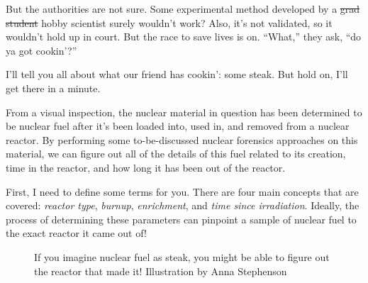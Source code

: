 {\begin{shadequote}
  But the authorities are not sure. Some experimental method developed by a
  \sout{grad student} hobby scientist surely wouldn't work? Also, it's not
  validated, so it wouldn't hold up in court. But the race to save lives is on.
  ``What,'' they ask, ``do ya got cookin'?''

\end{shadequote}

\narr I'll tell you all about what our friend has cookin': some steak. But hold
on, I'll get there in a minute.

From a visual inspection, the nuclear material in question has been determined
to be nuclear fuel after it's been loaded into, used in, and removed from a
nuclear reactor. By performing some to-be-discussed nuclear forensics
approaches on this material, we can figure out all of the details of this fuel
related to its creation, time in the reactor, and how long it has been out of
the reactor. 

First, I need to define some terms for you. There are four main concepts that
are covered: \textit{reactor type}, \textit{burnup}, \textit{enrichment}, and
\textit{time since irradiation}.  Ideally, the process of determining these
parameters can pinpoint a sample of nuclear fuel to the exact reactor it came
out of!

\begin{figure}[!htb]
  \centering
  \large If you imagine nuclear fuel as steak, you might be able to figure out 
  the reactor that made it! \small Illustration by Anna Stephenson
\end{figure}

}
